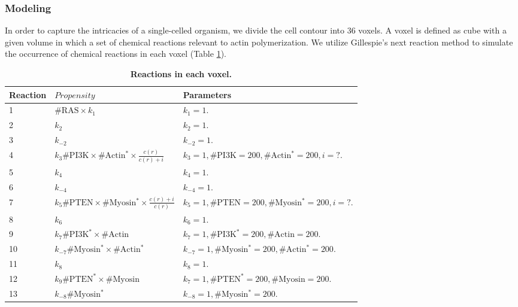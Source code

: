 \documentclass[10pt,letterpaper]{article}
\begin{document}
\subsubsection*{Modeling}
In order to capture the intricacies of a single-celled organism, we divide the  cell contour into $36$ voxels. A voxel is defined as cube with a given volume in which a set of chemical reactions relevant to actin polymerization. We utilize Gillespie's next reaction method to simulate the occurrence of chemical reactions in each voxel (Table \ref{tab1}).

\begin{table}[!ht]
\begin{adjustwidth}{0in}{0in} %
\centering
\caption{{\bf Reactions in each voxel.}}
\begin{tabular}{  l l l}
\hline\hline
 \textbf{Reaction}  &  \textbf{$Propensity$} & Parameters \\ \hline
1  &  $\# \mathrm{RAS} \times k_1$ & $k_1 = 1.$  \\ 
2 & $k_2$&  $k_2=1.$ \\
3 & $k_{-2}$&  $k_{-2}=1.$ \\
4 &  $k_3\# \mathrm{PI3K} \times\# \mathrm{Actin^*}\times\frac{c(r)}{c(r)+i}  $ &  $k_3=1,\# \mathrm{PI3K}=200,\# \mathrm{Actin^*}=200, i=?.$ \\
5 & $k_4$&  $k_4=1.$ \\
6 & $k_{-4}$&  $k_{-4}=1.$ \\
7 &  $k_5\# \mathrm{PTEN} \times\# \mathrm{Myosin^*}\times\frac{c(r)+i}{c(r)}  $ &  $k_5=1,\# \mathrm{PTEN}=200,\# \mathrm{Myosin^*}=200, i=?.$ \\
8 & $k_6$&  $k_6=1.$ \\
9&  $k_7\# \mathrm{PI3K^*} \times\# \mathrm{Actin}  $ &  $k_7=1,\# \mathrm{PI3K^*}=200,\# \mathrm{Actin}=200.$ \\
10&  $k_{-7}\# \mathrm{Myosin^*} \times\# \mathrm{Actin^*}  $ &  $k_{-7}=1,\# \mathrm{Myosin^*}=200,\# \mathrm{Actin^*}=200.$ \\
11 & $k_8$&  $k_8=1.$ \\
12&  $k_9\# \mathrm{PTEN^*} \times\# \mathrm{Myosin}  $ &  $k_7=1,\# \mathrm{PTEN^*}=200,\# \mathrm{Myosin}=200.$ \\
13 & $k_{-8}\# \mathrm{Myosin^*}  $ &  $k_{-8}=1,\# \mathrm{Myosin^*}=200.$ \\
\end{tabular}
\label{tab1}
\end{adjustwidth}
\end{table}
\end{document}

